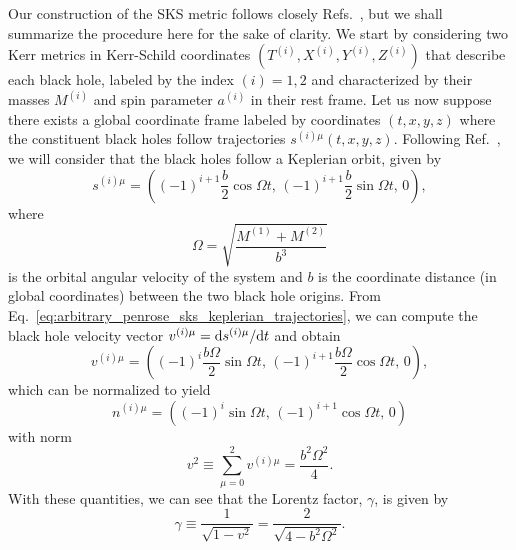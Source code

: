 Our construction of the \ac{SKS} metric follows closely Refs.~\cite{Armengol:2021shd, PhysRevD.104.044041}, but we shall summarize the procedure here for the sake of clarity. We start by considering two Kerr metrics in Kerr-Schild coordinates $(T^{(i)}, X^{(i)}, Y^{(i)}, Z^{(i)})$ that describe each black hole, labeled by the index $(i) = 1,2$ and characterized by their masses $M^{(i)}$ and spin parameter $a^{(i)}$ in their rest frame. Let us now suppose there exists a global coordinate frame labeled by coordinates $(t,x,y,z)$ where the constituent black holes follow trajectories $s^{(i) \mu}(t, x, y, z)$. Following Ref.~\cite{Armengol:2021shd}, we will consider that the black holes follow a Keplerian orbit, given by
%
\begin{equation}
  s^{(i) \mu} = \left( (-1)^{i + 1}\frac{b}{2}\cos\Omega t,\, (-1)^{i + 1}\frac{b}{2}\sin\Omega t,\, 0 \right),
  \label{eq:arbitrary_penrose_sks_keplerian_trajectories}
\end{equation}
%
where
%
\begin{equation}
  \Omega = \sqrt{\frac{M^{(1)} + M^{(2)}}{b^3}}
  \label{eq:arbitrary_penrose_sks_angular_velocity}
\end{equation}
%
is the orbital angular velocity of the system and $b$ is the coordinate distance (in global coordinates) between the two black hole origins. From Eq.~\eqref{eq:arbitrary_penrose_sks_keplerian_trajectories}, we can compute the black hole velocity vector $v^{(i) \mu} = \mathrm{d} s^{(i) \mu} / \mathrm{d} t$ and obtain
%
\begin{equation}
  v^{(i) \mu} = \left( (-1)^i \frac{b\Omega}{2} \sin \Omega t,\, (-1)^{i+1} \frac{b\Omega}{2} \cos\Omega t,\, 0 \right),
  \label{eq:arbitrary_penrose_sks_keplerian_velocities}
\end{equation}
%
which can be normalized to yield
%
\begin{equation}
  n^{(i) \mu} = \left( (-1)^i \sin\Omega t,\, (-1)^{i+1}\cos\Omega t,\, 0 \right)
  \label{eq:arbitrary_penrose_sks_keplerian_velocities_norms}
\end{equation}
%
with norm
%
\begin{equation}
  v^2 \equiv \sum_{\mu = 0}^{2} v^{(i) \mu} = \frac{b^2 \Omega^2}{4}.
  \label{eq:arbitrary_penrose_sks_keplerian_velocities_norm}
\end{equation}
%
With these quantities, we can see that the Lorentz factor, $\gamma$, is given by
%
\begin{equation}
  \gamma \equiv \frac{1}{\sqrt{1 - v^2}} = \frac{2}{\sqrt{4 - b^2\Omega^2}}.
  \label{eq:arbitrary_penrose_sks_keplerian_orbit_lorentz_factor}
\end{equation}

